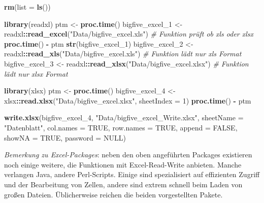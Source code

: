 \documentclass[]{article}
\newenvironment{Shaded}{\begin{snugshade}}{\end{snugshade}}
\newcommand{\KeywordTok}[1]{\textcolor[rgb]{0.13,0.29,0.53}{\textbf{#1}}}
\newcommand{\DataTypeTok}[1]{\textcolor[rgb]{0.13,0.29,0.53}{#1}}
\newcommand{\DecValTok}[1]{\textcolor[rgb]{0.00,0.00,0.81}{#1}}
\newcommand{\StringTok}[1]{\textcolor[rgb]{0.31,0.60,0.02}{#1}}
\newcommand{\CommentTok}[1]{\textcolor[rgb]{0.56,0.35,0.01}{\textit{#1}}}
\newcommand{\OtherTok}[1]{\textcolor[rgb]{0.56,0.35,0.01}{#1}}
\newcommand{\OperatorTok}[1]{\textcolor[rgb]{0.81,0.36,0.00}{\textbf{#1}}}
\newcommand{\NormalTok}[1]{#1}
\begin{document}
\begin{Shaded}
\begin{Highlighting}[]
  \KeywordTok{rm}\NormalTok{(}\DataTypeTok{list =} \KeywordTok{ls}\NormalTok{())}
  
  \KeywordTok{library}\NormalTok{(readxl)}
\NormalTok{    ptm <-}\StringTok{ }\KeywordTok{proc.time}\NormalTok{()}
\NormalTok{    bigfive_excel_}\DecValTok{1}\NormalTok{ <-}\StringTok{ }\NormalTok{readxl}\OperatorTok{::}\KeywordTok{read_excel}\NormalTok{(}\StringTok{"Data/bigfive_excel.xls"}\NormalTok{) }\CommentTok{# Funktion prüft ob xls oder xlsx}
    \KeywordTok{proc.time}\NormalTok{() }\OperatorTok{-}\StringTok{ }\NormalTok{ptm}
    \KeywordTok{str}\NormalTok{(bigfive_excel_}\DecValTok{1}\NormalTok{)  }
\NormalTok{    bigfive_excel_}\DecValTok{2}\NormalTok{ <-}\StringTok{ }\NormalTok{readxl}\OperatorTok{::}\KeywordTok{read_xls}\NormalTok{(}\StringTok{"Data/bigfive_excel.xls"}\NormalTok{) }\CommentTok{# Funktion lädt nur xls Format}
\NormalTok{    bigfive_excel_}\DecValTok{3}\NormalTok{ <-}\StringTok{ }\NormalTok{readxl}\OperatorTok{::}\KeywordTok{read_xlsx}\NormalTok{(}\StringTok{"Data/bigfive_excel.xlsx"}\NormalTok{) }\CommentTok{# Funktion lädt nur xlsx Format}

  \KeywordTok{library}\NormalTok{(xlsx)}
\NormalTok{    ptm <-}\StringTok{ }\KeywordTok{proc.time}\NormalTok{()}
\NormalTok{    bigfive_excel_}\DecValTok{4}\NormalTok{ <-}\StringTok{ }\NormalTok{xlsx}\OperatorTok{::}\KeywordTok{read.xlsx}\NormalTok{(}\StringTok{"Data/bigfive_excel.xlsx"}\NormalTok{, }\DataTypeTok{sheetIndex =} \DecValTok{1}\NormalTok{)}
    \KeywordTok{proc.time}\NormalTok{() }\OperatorTok{-}\StringTok{ }\NormalTok{ptm}
    
    \KeywordTok{write.xlsx}\NormalTok{(bigfive_excel_}\DecValTok{4}\NormalTok{, }
               \StringTok{"Data/bigfive_excel_Write.xlsx"}\NormalTok{, }
               \DataTypeTok{sheetName =} \StringTok{"Datenblatt"}\NormalTok{, }
               \DataTypeTok{col.names =} \OtherTok{TRUE}\NormalTok{, }
               \DataTypeTok{row.names =} \OtherTok{TRUE}\NormalTok{, }
               \DataTypeTok{append    =} \OtherTok{FALSE}\NormalTok{, }
               \DataTypeTok{showNA    =} \OtherTok{TRUE}\NormalTok{, }
               \DataTypeTok{password  =} \OtherTok{NULL}\NormalTok{)}
\end{Highlighting}
\end{Shaded}

\emph{Bemerkung zu Excel-Packages}: neben den oben angeführten Packages
existieren noch einige weitere, die Funktionen mit Excel-Read-Write
anbieten. Manche verlangen Java, andere Perl-Scripts. Einige sind
spezialisiert auf effizienten Zugriff und der Bearbeitung von Zellen,
andere sind extrem schnell beim Laden von großen Dateien. Üblicherweise
reichen die beiden vorgestellten Pakete.
\end{document}
